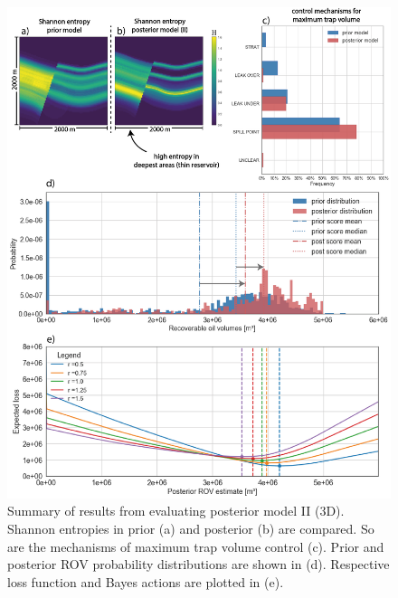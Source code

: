 \documentclass[a4paper,11pt]{MScThesis}
\begin{document}
    \begin{figure}[p!]
    	\centering
    	\includegraphics[width=1\textwidth]{Figures/Appendix/ML3}
    	\caption{Summary of results from evaluating posterior model II (3D). Shannon entropies in prior (a) and posterior (b) are compared. So are the mechanisms of maximum trap volume control (c). Prior and posterior ROV probability distributions are shown in (d). Respective loss function and Bayes actions are plotted in (e).}\label{fig:ML3}
    \end{figure}
\end{document}
